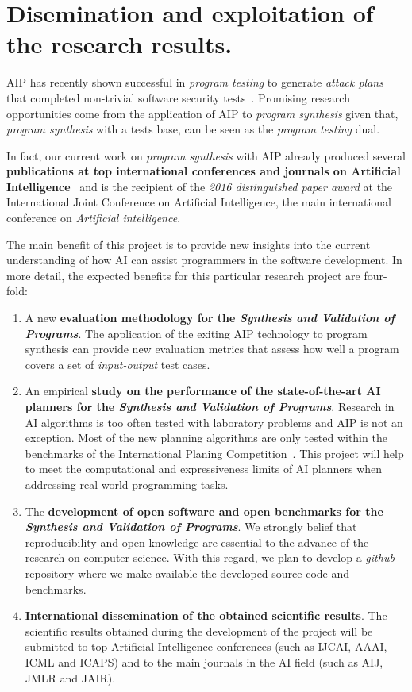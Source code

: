 \documentclass[10pt,a4paper]{paper}
\begin{document}
\section{Disemination and exploitation of the research results.}
\label{subsec:beneficios}
AIP has recently shown successful in {\em program testing} to generate {\em attack plans} that completed non-trivial software security tests~\cite{hoffmann2015simulated,steinmetz2016revisiting,shmaryahu2016constructing,steinmetz2016goal}. Promising research opportunities come from the application of AIP to {\em program synthesis} given that, {\em program synthesis} with a tests base, can be seen as the {\em program testing} dual.

In fact, our current work on {\em program synthesis} with AIP already produced several {\bf publications at top international conferences and journals on Artificial Intelligence}~\cite{segovia2017generating,sergio:aprogramingb:ijcai16,sergio:aprograming:ijcai16,sergio:aprograming:icaps16,segovia:FSC:JAIR2018,segovia:programs:AIJ19} and is the recipient of the {\it 2016 distinguished paper award} at the International Joint Conference on Artificial Intelligence, the main international conference on {\em Artificial intelligence}. 

The main benefit of this project is to provide new insights into the current understanding of how AI can assist programmers in the software development. In more detail, the expected benefits for this particular research project are four-fold:
\begin{enumerate}
\item A new {\bf evaluation methodology for the {\em Synthesis and Validation of Programs}}. The application of the exiting AIP technology to program synthesis can provide new evaluation metrics that assess how well a program covers a set of {\em input-output} test cases.  
\item An empirical {\bf study on the performance of the state-of-the-art AI planners for the {\em Synthesis and Validation of Programs}}. Research in AI algorithms is too often tested with laboratory problems and AIP is not an exception. Most of the new planning algorithms are only tested within the benchmarks of the International Planing Competition~\cite{vallati:IPC:AI15}. This project will help to meet the computational and expressiveness limits of AI planners when addressing real-world programming tasks. 
\item The {\bf development of open software and open benchmarks for the {\em Synthesis and Validation of Programs}}. We strongly belief that reproducibility and open knowledge are essential to the advance of the research on computer science. With this regard, we plan to develop a {\em github} repository where we make available the developed source code and benchmarks.
\item {\bf International dissemination of the obtained scientific results}. The scientific results obtained during the development of the project will be submitted to top Artificial Intelligence conferences (such as IJCAI, AAAI, ICML and ICAPS) and to the main journals in the AI field (such as AIJ, JMLR and JAIR).
\end{enumerate}

\vspace{0.3cm}


\begin{scriptsize}

\end{scriptsize}

\end{document}
